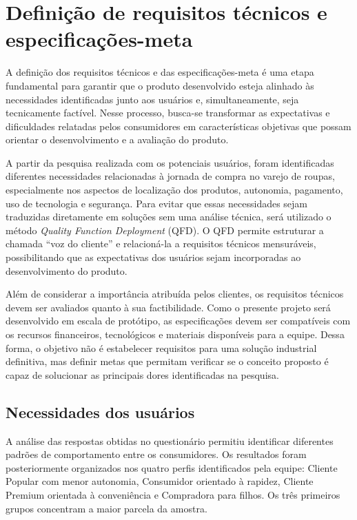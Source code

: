\section{Definição de requisitos técnicos e especificações-meta}
\label{sec:definicao_requisitos}

A definição dos requisitos técnicos e das especificações-meta é uma etapa fundamental para garantir que o produto desenvolvido esteja alinhado às necessidades identificadas junto aos usuários e, simultaneamente, seja tecnicamente factível. Nesse processo, busca-se transformar as expectativas e dificuldades relatadas pelos consumidores em características objetivas que possam orientar o desenvolvimento e a avaliação do produto.

A partir da pesquisa realizada com os potenciais usuários, foram identificadas diferentes necessidades relacionadas à jornada de compra no varejo de roupas, especialmente nos aspectos de localização dos produtos, autonomia, pagamento, uso de tecnologia e segurança. Para evitar que essas necessidades sejam traduzidas diretamente em soluções sem uma análise técnica, será utilizado o método \textit{Quality Function Deployment} (QFD). O QFD permite estruturar a chamada ``voz do cliente'' e relacioná-la a requisitos técnicos mensuráveis, possibilitando que as expectativas dos usuários sejam incorporadas ao desenvolvimento do produto.

Além de considerar a importância atribuída pelos clientes, os requisitos técnicos devem ser avaliados quanto à sua factibilidade. Como o presente projeto será desenvolvido em escala de protótipo, as especificações devem ser compatíveis com os recursos financeiros, tecnológicos e materiais disponíveis para a equipe. Dessa forma, o objetivo não é estabelecer requisitos para uma solução industrial definitiva, mas definir metas que permitam verificar se o conceito proposto é capaz de solucionar as principais dores identificadas na pesquisa.

\subsection{Necessidades dos usuários}
\label{subsec:necessidades_usuarios}

A análise das respostas obtidas no questionário permitiu identificar diferentes padrões de comportamento entre os consumidores. Os resultados foram posteriormente organizados nos quatro perfis identificados pela equipe: Cliente Popular com menor autonomia, Consumidor orientado à rapidez, Cliente Premium orientada à conveniência e Compradora para filhos. Os três primeiros grupos concentram a maior parcela da amostra.

